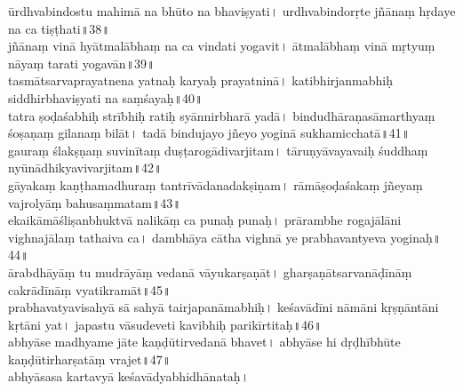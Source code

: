 \begin{HalfText}
\begin{sans}
ūrdhvabindostu mahimā na bhūto na bhaviṣyati\!।
urdhvabindorṛte\endnote{urdhva~] \textit{emend}., urdhvaṃ M.} jñānaṃ hṛdaye na ca tiṣṭhati\!॥38\!॥\\
jñānaṃ vinā hyātmalābhaṃ na ca vindati yogavit\!। 
ātmalābhaṃ vinā mṛtyuṃ nāyaṃ tarati yogavān\!॥39\!॥\\
tasmātsarvaprayatnena yatnaḥ karyaḥ prayatninā\!। 
katibhirjanmabhiḥ\endnote{janmabhiḥ~] \textit{corr.}, janmabhis M.} siddhirbhaviṣyati na saṃśayaḥ\!॥40\!॥\\
tatra ṣoḍaśabhiḥ\endnote{ṣoḍaśabhiḥ~] \textit{corr.}, ṣoḍaśabhi M.} strībhiḥ ratiḥ syānnirbharā yadā\!। 
bindudhāraṇasāmarthyaṃ śoṣaṇaṃ gilanaṃ bilāt\!। 
tadā bindujayo jñeyo yoginā sukhamicchatā\!॥41\!॥\\
gauraṃ ślakṣṇaṃ suvinītaṃ duṣṭarogādivarjitam\!। 
tāruṇyāvayavaiḥ śuddhaṃ nyūnādhikyavivarjitam\!॥42\!॥\\
gāyakaṃ kaṇṭhamadhuraṃ tantrīvādanadakṣiṇam\!। 
rāmāṣoḍaśakaṃ jñeyaṃ vajrolyāṃ bahusaṃmatam\!॥43\!॥\\
ekaikāmāśliṣanbhuktvā\endnote{°śliṣan~] \textit{conj.} \textsc{Goodall}, °śliṣāṃ M.} nalikāṃ ca punaḥ punaḥ\!। 
prārambhe rogajālāni vighnajālaṃ tathaiva ca\!। 
dambhāya\endnote{dambhāya~] \textit{conj.} \textsc{Goodall}, dambhāyoś M.} cātha\endnote{cātha~] \textit{conj.}, catha M.} vighnā ye prabhavantyeva yoginaḥ\!॥44\!॥\\
ārabdhāyāṃ tu mudrāyāṃ vedanā vāyukarṣaṇāt\!। 
gharṣaṇātsarvanāḍīnāṃ cakrādīnāṃ vyatikramāt\!॥45\!॥\\
prabhavatyavisahyā sā sahyā tairjapanāmabhiḥ\endnote{tair~] \textit{emend.},  °tsā M.}\!। 
keśavādīni nāmāni kṛṣṇāntāni kṛtāni yat\!। 
japastu vāsudeveti kavibhiḥ parikīrtitaḥ\!॥46\!॥\\
abhyāse madhyame jāte kaṇḍūtirvedanā bhavet\!। 
abhyāse hi dṛḍhībhūte kaṇḍūtirharṣatāṃ vrajet\!॥47\!॥\\
abhyāsasa kartavyā keśavādyabhidhānataḥ\!। 
\end{sans}
\end{HalfText}

